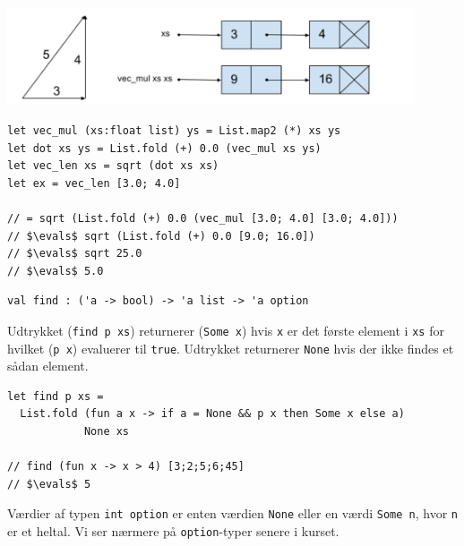 \documentclass[rgb]{beamer}
\begin{document}
\begin{frame}[fragile]
\begin{footnotesize}
\vspace{1ex}

\includegraphics[width=0.9\textwidth]{vec345.png}

\begin{lstlisting}[numbers=none,frame=none,mathescape]
let vec_mul (xs:float list) ys = List.map2 (*) xs ys
let dot xs ys = List.fold (+) 0.0 (vec_mul xs ys)
let vec_len xs = sqrt (dot xs xs)
let ex = vec_len [3.0; 4.0]

// = sqrt (List.fold (+) 0.0 (vec_mul [3.0; 4.0] [3.0; 4.0]))
// $\evals$ sqrt (List.fold (+) 0.0 [9.0; 16.0])
// $\evals$ sqrt 25.0
// $\evals$ 5.0
\end{lstlisting}

\end{footnotesize}
\end{frame}

\begin{frame}[fragile]
\begin{footnotesize}
\vspace{1ex}

\begin{lstlisting}[numbers=none,frame=none,mathescape]
val find : ('a -> bool) -> 'a list -> 'a option
\end{lstlisting}

Udtrykket (\lstinline{find p xs}) returnerer (\lstinline{Some x}) hvis
\lstinline{x} er det første element i \lstinline{xs} for hvilket
(\lstinline{p x}) evaluerer til \lstinline{true}. Udtrykket returnerer
\lstinline{None} hvis der ikke findes et sådan element.

\vspace{1ex}
\vspace{1ex}

\begin{lstlisting}[numbers=none,frame=none,mathescape]
let find p xs =
  List.fold (fun a x -> if a = None && p x then Some x else a)
            None xs

// find (fun x -> x > 4) [3;2;5;6;45]
// $\evals$ 5
\end{lstlisting}


Værdier af typen \lstinline{int option} er enten værdien
\lstinline{None} eller en værdi \lstinline{Some n}, hvor \lstinline{n}
er et heltal.
%
Vi ser nærmere på \lstinline{option}-typer senere i kurset.
\end{footnotesize}
\end{frame}
\end{document}
